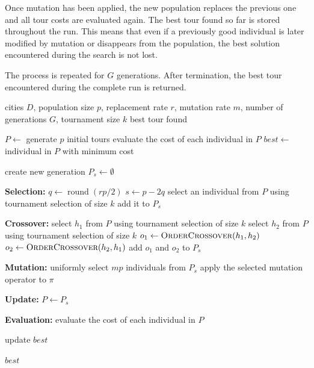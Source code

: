 \documentclass[11pt,a4paper]{article}
\begin{document}
Once mutation has been applied, the new population replaces the previous one
and all tour costs are evaluated again. The best tour found so far is stored
throughout the run. This means that even if a previously good individual is
later modified by mutation or disappears from the population, the best solution
encountered during the search is not lost.

The process is repeated for $G$ generations. After termination, the best tour
encountered during the complete run is returned.


\begin{algorithm}[H]
\caption{Genetic Algorithm for the Travelling Salesman Problem}
\begin{algorithmic}
\Require cities $D$, population size $p$, replacement rate $r$, mutation rate $m$, number of generations $G$, tournament size $k$
\Ensure best tour found

\State $P \gets$ generate $p$ initial tours
\State evaluate the cost of each individual in $P$
\State $best \gets$ individual in $P$ with minimum cost

    \State create new generation $P_s \gets \emptyset$

    \Statex
    \State \textbf{Selection:}
    \State $q \gets \operatorname{round}(rp/2)$
    \State $s \gets p - 2q$
        \State select an individual from $P$ using tournament selection of size $k$
        \State add it to $P_s$
    \EndFor

    \Statex
    \State \textbf{Crossover:}
        \State select $h_1$ from $P$ using tournament selection of size $k$
        \State select $h_2$ from $P$ using tournament selection of size $k$
        \State $o_1 \gets \textsc{OrderCrossover}(h_1,h_2)$
        \State $o_2 \gets \textsc{OrderCrossover}(h_2,h_1)$
        \State add $o_1$ and $o_2$ to $P_s$
    \EndFor

     \Statex
    \State \textbf{Mutation:}
    \State uniformly select $mp$ individuals from $P_s$
        \State apply the selected mutation operator to $\pi$
    \EndFor

    \Statex
    \State \textbf{Update:}
    \State $P \gets P_s$

    \Statex
    \State \textbf{Evaluation:}
    \State evaluate the cost of each individual in $P$

        \State update $best$
    \EndIf
\EndFor

\State \Return $best$

\end{algorithmic}
\end{algorithm}
\end{document}

